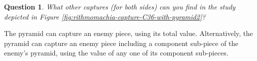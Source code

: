 \documentclass[14pt]{extarticle}
\newtheorem{example}[theorem]{Example}
\newtheorem{question}{Question}
\begin{document}
\begin{question}
What other captures (for both sides) can you find in the study
depicted in Figure \ref{fig:rithmomachia-capture-C36-with-pyramid2}?
\end{question}
  

The pyramid can capture an enemy piece, using its total value.
Alternatively, the pyramid can capture an enemy piece including a
component sub-piece of the enemy's pyramid, using the value of any
one of its component sub-pieces.

\end{document}
